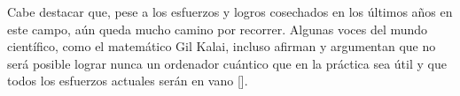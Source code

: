 Cabe destacar que, pese a los esfuerzos y logros cosechados en los últimos años en este campo, aún queda mucho camino por recorrer. Algunas voces del mundo científico, como el matemático  Gil Kalai, incluso afirman y argumentan que no será posible lograr nunca un ordenador cuántico que en la práctica sea útil y que todos los esfuerzos actuales serán en vano [\cite{kalai2011quantum}].